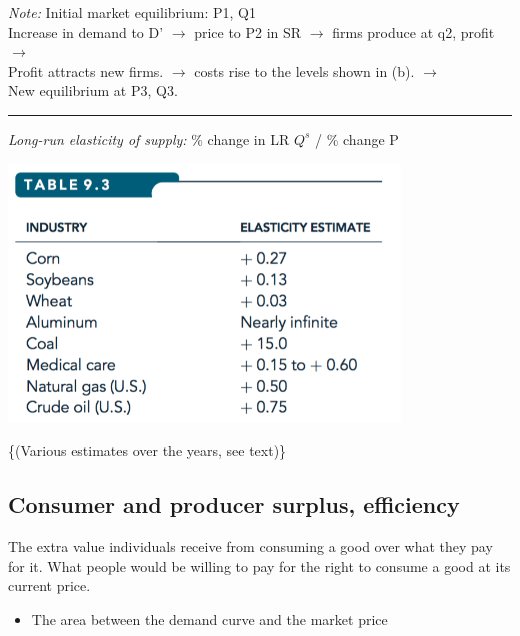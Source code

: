 \documentclass[]{article}
\providecommand{\tightlist}{%
  \setlength{\itemsep}{0pt}\setlength{\parskip}{0pt}}
\begin{document}
\emph{Note:} Initial market equilibrium: P1, Q1\\
Increase in demand to D' \(\rightarrow\) price to P2 in SR
\(\rightarrow\) firms produce at q2, profit \(\rightarrow\)\\
Profit attracts new firms. \(\rightarrow\) costs rise to the levels
shown in (b). \(\rightarrow\)\\
New equilibrium at P3, Q3.

\begin{center}\rule{0.5\linewidth}{\linethickness}\end{center}

\emph{Long-run elasticity of supply:} \% change in LR \(Q^s\) / \%
change P

\includegraphics[height=2.7in]{picsfigs/lr_supplyelast_ests.png}

\footnotesize\{(Various estimates over the years, see text)\}

\hypertarget{consumer-and-producer-surplus-efficiency}{%
\subsection{Consumer and producer surplus,
efficiency}\label{consumer-and-producer-surplus-efficiency}}

\begin{description}
\tightlist
\item[Consumer surplus (reprise)]
The extra value individuals receive from consuming a good over what they
pay for it. What people would be willing to pay for the right to consume
a good at its current price.
\end{description}

\begin{itemize}
\tightlist
\item
  The area between the demand curve and the market price
\end{itemize}
\end{document}
